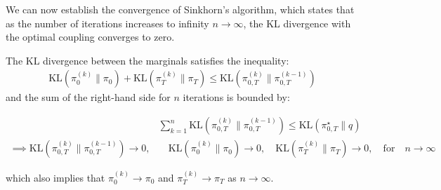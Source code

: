 \documentclass{article}
\begin{document}
We can now establish the convergence of Sinkhorn's algorithm, which states that as the number of iterations increases to infinity $n\to \infty$, the KL divergence with the optimal coupling converges to zero.

\begin{corollary}
    The KL divergence between the marginals satisfies the inequality:
    \begin{align}
        \text{KL}(\pi^{(k)}_{0}\|\pi_{0})+\text{KL}(\pi^{(k)}_{T}\|\pi_{T})\leq \text{KL}(\pi^{(k)}_{0,T}\|\pi_{0,T}^{(k-1)})
    \end{align}
    and the sum of the right-hand side for $n$ iterations is bounded by:
    \begin{small}
    \begin{align}
        &\sum_{k=1}^n \text{KL}(\pi^{(k)}_{0,T}\|\pi_{0,T}^{(k-1)})\leq  \text{KL}(\pi^\star_{0,T}\|q)\\
        \implies  \text{KL}(\pi^{(k)}_{0,T}\|\pi_{0,T}^{(k-1)})\to 0, &\quad \text{KL}(\pi^{(k)}_{0}\|\pi_{0})\to 0, \quad \text{KL}(\pi^{(k)}_{T}\|\pi_{T})\to 0, \quad \text{for} \quad n\to \infty
    \end{align}
    \end{small}
    which also implies that $\pi_0^{(k)}\to \pi_0$ and $\pi_T^{(k)}\to \pi_T$ as $n\to \infty$.
\end{corollary}
\end{document}
